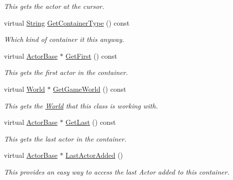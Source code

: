 \begin{DoxyCompactItemize}
\begin{DoxyCompactList}\small\item\em This gets the actor at the cursor. \item\end{DoxyCompactList}\item 
virtual \hyperlink{namespaceMezzanine_acf9fcc130e6ebf08e3d8491aebcf1c86}{String} \hyperlink{classMezzanine_1_1ActorContainerVector_a22c7e6456504a7a7f93825936d2d2b8f}{GetContainerType} () const 
\begin{DoxyCompactList}\small\item\em Which kind of container it this anyway. \item\end{DoxyCompactList}\item 
virtual \hyperlink{classMezzanine_1_1ActorBase}{ActorBase} $\ast$ \hyperlink{classMezzanine_1_1ActorContainerVector_ab39133337c950be6207e0ba46f151af9}{GetFirst} () const 
\begin{DoxyCompactList}\small\item\em This gets the first actor in the container. \item\end{DoxyCompactList}\item 
virtual \hyperlink{classMezzanine_1_1World}{World} $\ast$ \hyperlink{classMezzanine_1_1ActorContainerVector_afa1152c7bd84d8eba51bc4abe0500e51}{GetGameWorld} () const 
\begin{DoxyCompactList}\small\item\em This gets the \hyperlink{classMezzanine_1_1World}{World} that this class is working with. \item\end{DoxyCompactList}\item 
virtual \hyperlink{classMezzanine_1_1ActorBase}{ActorBase} $\ast$ \hyperlink{classMezzanine_1_1ActorContainerVector_a1b42e0385132ded405dd1f9558216938}{GetLast} () const 
\begin{DoxyCompactList}\small\item\em This gets the last actor in the container. \item\end{DoxyCompactList}\item 
virtual \hyperlink{classMezzanine_1_1ActorBase}{ActorBase} $\ast$ \hyperlink{classMezzanine_1_1ActorContainerVector_aaa354835e75bd28fb2fe7e51a8e73ca6}{LastActorAdded} ()
\begin{DoxyCompactList}\small\item\em This provides an easy way to access the last Actor added to this container. \item\end{DoxyCompactList}\item 

\end{DoxyCompactItemize}
